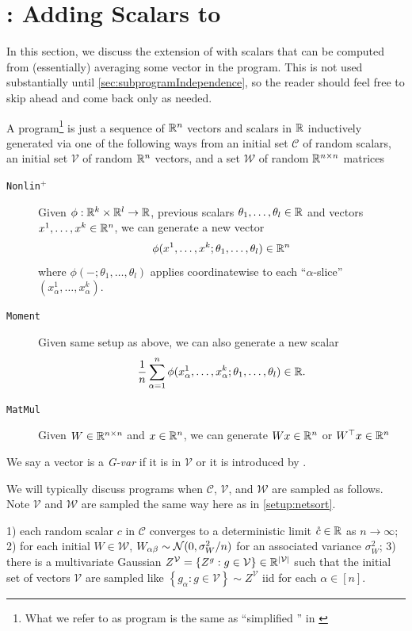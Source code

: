 \documentclass[main.tex]{subfiles}
\begin{document}
\section{\netsortplus{}: Adding Scalars to \netsort{}}
\label{sec:netsortplus}

In this section, we discuss the extension of \netsort{} with scalars that can be computed from (essentially) averaging some vector in the program.
This is not used substantially until \cref{sec:subprogramIndependence}, so the reader should feel free to skip ahead and come back only as needed.
\begin{defn}\label{defn:netsortplus}
A \netsortplus{} program\footnote{What we refer to as \netsortplus{} program is the same as ``simplified \netsortplus{}'' in \citet{yangTP2}} is just a sequence of $\mathbb{R}^{n}$ vectors and scalars in $\mathbb{R}$ inductively generated via one of the following ways from an initial set $\mathcal{C}$ of random scalars, an initial set $\mathcal{V}$ of random $\mathbb{R}^{n}$ vectors, and a set $\mathcal{W}$ of random $\mathbb{R}^{n\times n}$ matrices

\begin{description}
\item [\texttt{Nonlin$^+$\label{instr:nonlin+}}] Given $\phi:\mathbb{R}^{k}\times\mathbb{R}^{l}\to\mathbb{R}$, previous scalars $\theta_{1},\ldots,\theta_{l}\in\mathbb{R}$ and vectors $x^{1},\ldots,x^{k}\in\mathbb{R}^{n}$, we can generate a new vector 
\[
\phi(x^{1},\ldots,x^{k};\theta_{1},\ldots,\theta_{l})\in\mathbb{R}^{n}
\]
where $\phi(-;\theta_{1},\ldots,\theta_{l})$ applies coordinatewise to each ``$\alpha$-slice'' $(x_{\alpha}^{1},\ldots,x_{\alpha}^{k})$. 
\item [\texttt{Moment\label{instr:moment}}] Given same setup as above, we can also generate a new scalar 
\[
\frac{1}{n}\sum_{\alpha=1}^{n}\phi(x_{\alpha}^{1},\ldots,x_{\alpha}^{k};\theta_{1},\ldots,\theta_{l})\in\mathbb{R}.
\]
\item [\texttt{MatMul\label{instr:matmul+}}] Given $W\in\mathbb{R}^{n\times n}$ and $x\in\mathbb{R}^{n}$, we can generate $Wx\in\mathbb{R}^{n}$ or $W^{\top}x\in\mathbb{R}^{n}$ 
\end{description}
We say a vector is a \emph{G-var} if it is in $\mathcal{V}$ or it is introduced by .
\end{defn}
We will typically discuss \netsortplus{} programs when $\mathcal{C}$, $\mathcal{V}$, and $\mathcal{W}$ are sampled as follows.
Note $\mathcal{V}$ and $\mathcal{W}$ are sampled the same way here as in \cref{setup:netsort}.

\begin{setup}[\netsortplus{}]\label{setup:netsortplus}
    1) each random scalar $c$ in $\mathcal{C}$ converges to a deterministic limit $\mathring{c}\in\mathbb{R}$ as $n\to\infty$; 2) for each initial $W\in\mathcal{W}$, $W_{\alpha\beta}\sim\mathcal{N}(0,\sigma_{W}^{2}/n)$ for an associated variance $\sigma_{W}^{2}$; 3) there is a multivariate Gaussian $Z^{\mathcal{V}}=\left\{ Z^{g}:g\in\mathcal{V}\right\} \in\mathbb{R}^{|\mathcal{V}|}$ such that the initial set of vectors $\mathcal{V}$ are sampled like $\left\{ g_{\alpha}:g\in\mathcal{V}\right\} \sim Z^{\mathcal{V}}$ iid for each $\alpha\in[n]$.
\end{setup}
\end{document}

